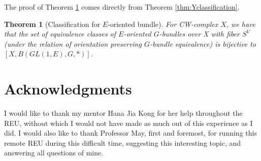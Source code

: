\documentclass[psamsfonts]{amsart}
\newtheorem{thm}{Theorem}[section]
\theoremstyle{definition}
\theoremstyle{remark}
\numberwithin{equation}{section}
\begin{document}
The proof of Theorem \ref{thm:ori} comes directly from Theorem \ref{thm:Yclassification}.

\begin{thm} [Classification for $E$-oriented bundle]
\label{thm:ori}
For CW-complex $X$, we have that the set of equivalence classes of $E$-oriented $G$-bundles over X with fiber $S^{V}$ (under the relation of orientation preserving $G$-bundle equivalence) is bijective to $[X, B(GL(1, E), G, *)]$.
\end{thm}




\section*{Acknowledgments} 
I would like to thank my mentor Hana Jia Kong for her help throughout the REU, without which I would not have made as much out of this experience as I did. I would also like to thank Professor May, first and foremost, for running this remote REU during this difficult time, suggesting this interesting topic, and answering all questions of mine.


 
 
 
\end{document}
